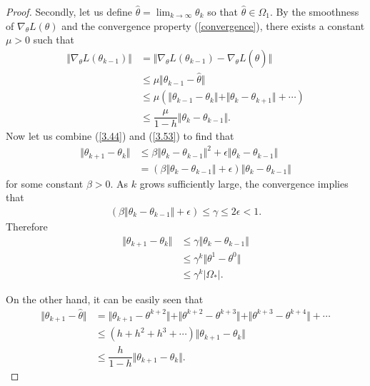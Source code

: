\documentclass[a4paper, 11pt]{article}
\numberwithin{equation}{section}
\begin{document}
\begin{proof}
\quad\quad Secondly, let us define $\hat{\theta} = \lim_{k\rightarrow \infty} \theta_{k}$ so that $\hat{\theta} \in \Omega_1$. By the smoothness of $\nabla_{\theta}L(\theta)$ and the convergence property (\ref{convergence}), there exists a constant $\mu>0$ such that
\begin{align}
\Vert \nabla_{\theta}L(\theta_{k-1}) \Vert &=  \Vert \nabla_{\theta}L(\theta_{k-1}) - \nabla_{\theta}L(\hat{\theta}) \Vert \\
&\leq \mu \Vert \theta_{k-1} - \hat{\theta} \Vert \\
& \leq \mu\left( \Vert \theta_{k-1} - \theta_k \Vert + \Vert \theta_k - \theta_{k+1} \Vert + \cdots \right)  \\
& \leq \dfrac{\mu}{1-h} \Vert \theta_k - \theta_{k-1} \Vert.\label{3.53}
\end{align}
Now let us combine (\ref{3.44}) and (\ref{3.53}) to find that
\begin{align}
\Vert \theta_{k+1} - \theta_k \Vert &\leq \beta \Vert \theta_k - \theta_{k-1} \Vert^2 + \epsilon \Vert \theta_k - \theta_{k-1} \Vert \\
 & = \left( \beta \Vert \theta_k - \theta_{k-1} \Vert + \epsilon \right)\Vert \theta_k - \theta_{k-1} \Vert
\end{align}
for some constant $\beta>0$. As $k$ grows sufficiently large, the convergence implies that 
\begin{align}
\left( \beta \Vert \theta_k - \theta_{k-1} \Vert + \epsilon  \right) \leq \gamma \leq  2 \epsilon < 1.
\end{align}
Therefore 
\begin{align}
\Vert \theta_{k+1} - \theta_k \Vert &\leq \gamma  \Vert \theta_k - \theta_{k-1} \Vert\\
&\leq \gamma^k \Vert \theta^{1} - \theta^{0} \Vert \\
& \leq \gamma^k \vert \Omega_* \vert.
\end{align}

On the other hand, it can be easily seen that 
\begin{align}
\Vert \theta_{k+1} - \hat{\theta} \Vert &= \Vert \theta_{k+1} - \theta^{k+2} \Vert + \Vert \theta^{k+2} - \theta^{k+3} \Vert  +  \Vert \theta^{k+3} - \theta^{k+4} \Vert  +  \cdots \\
&\leq \left( h + h^2 + h^3 + \cdots \right) \Vert \theta_{k+1} - \theta_k \Vert \\
&\leq \dfrac{h}{1-h} \Vert \theta_{k+1} - \theta_k \Vert.
\end{align}


\end{proof}
\end{document}
